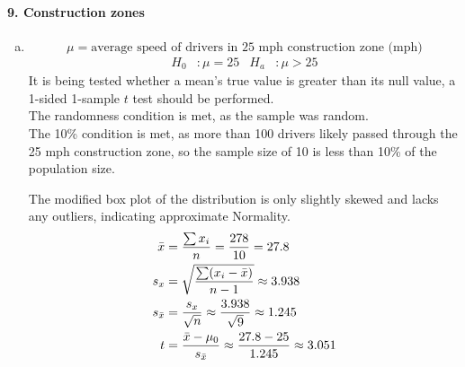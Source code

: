 \documentclass[../Homework]{subfiles}
\begin{document}
		\paragraph{9. Construction zones}
			\begin{enumerate}[a.]
				\item
					\[\mu = \text{average speed of drivers in 25 mph construction zone (mph)}\]
					\begin{align*}
						H_0&: \mu = 25 & H_a&: \mu > 25
					\end{align*}
					It is being tested whether a mean's true value is greater than its null value, a 1-sided 1-sample $t$ test should be performed. \\
					The randomness condition is met, as the sample was random. \\
					The 10\% condition is met, as more than 100 drivers likely passed through the 25 mph construction zone, so the sample size of 10 is less than 10\% of the population size. \\
					\begin{center}
					\end{center}
					The modified box plot of the distribution is only slightly skewed and lacks any outliers, indicating approximate Normality.
					\begin{align*}
						\bar{x} &= \frac{\sum x_i}{n} = \frac{278}{10} = 27.8 \\
						s_x &= \sqrt{\frac{\sum(x_i - \bar{x})}{n - 1}} \approx 3.938 \\
						s_{\bar{x}} &= \frac{s_x}{\sqrt{n}} \approx \frac{3.938}{\sqrt{9}} \approx 1.245 \\
						t &= \z{\bar{x}}{\mu_0}{s_{\bar{x}}} \approx \z{27.8}{25}{1.245} \approx 3.051 \\

\end{align*}
\end{enumerate}
\end{document}
